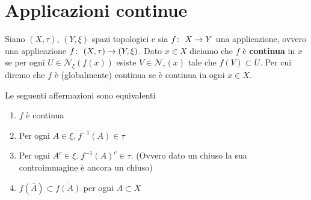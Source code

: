 \section{Applicazioni continue}

\begin{definition}
	Siano $(X,\tau)$, $(Y, \xi)$ spazi topologici e sia $f \colon\ X \rightarrow Y$ una applicazione, ovvero una applicazione $f \colon\ (X,\tau) \rightarrow (Y,\xi)$. Dato $x \in X$ diciamo che $f$ è \textbf{continua} in $x$ se per ogni $U \in \mathcal{N}_\xi(f(x))$ esiste $V \in \mathcal{N}_\tau(x)$ tale che $f(V) \subset U$. Per cui diremo che $f$ è (globalmente) continua se è continua in ogni $x \in X$.
\end{definition}


\begin{theorem}
	Le seguenti affermazioni sono equivalenti
	\begin{enumerate}
		\item $f$ è continua
		\item Per ogni $A \in \xi  . \; f^{-1}(A) \in \tau$
		\item Per ogni $A^c \in \xi  . \; f^{-1}(A)^c \in \tau$. (Ovvero dato un chiuso la sua controimmagine è ancora un chiuso)
		\item $f(\overline{A}) \subset \overline{f(A)}$ per ogni $A \subset X$
	\end{enumerate}
\end{theorem}
